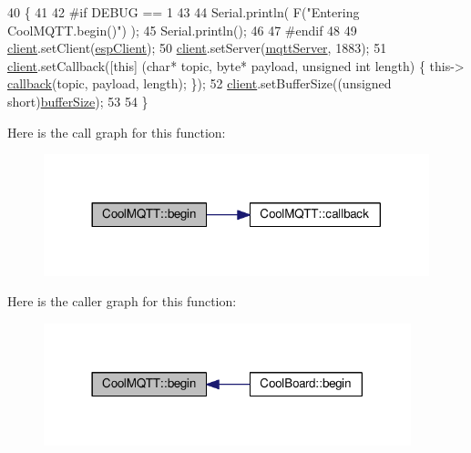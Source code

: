 \begin{DoxyCode}
40 \{ 
41 
42 \textcolor{preprocessor}{#if DEBUG == 1 }
43 
44     Serial.println( F(\textcolor{stringliteral}{"Entering CoolMQTT.begin()"}) );
45     Serial.println();
46 
47 \textcolor{preprocessor}{#endif}
48 
49     \hyperlink{classCoolMQTT_a4ca71e4f76ef868692a297efd45b1415}{client}.setClient(\hyperlink{classCoolMQTT_acc30a0200967374a524092a8a806502a}{espClient});
50     \hyperlink{classCoolMQTT_a4ca71e4f76ef868692a297efd45b1415}{client}.setServer(\hyperlink{classCoolMQTT_ab8bb951f87ddbf92db74c2ad16a3e53e}{mqttServer}, 1883); 
51     \hyperlink{classCoolMQTT_a4ca71e4f76ef868692a297efd45b1415}{client}.setCallback([\textcolor{keyword}{this}] (\textcolor{keywordtype}{char}* topic, byte* payload, \textcolor{keywordtype}{unsigned} \textcolor{keywordtype}{int} length) \{ this->
      \hyperlink{classCoolMQTT_a30d82ad665bfb603f46ecdbc290775df}{callback}(topic, payload, length); \});
52     \hyperlink{classCoolMQTT_a4ca71e4f76ef868692a297efd45b1415}{client}.setBufferSize((\textcolor{keywordtype}{unsigned} \textcolor{keywordtype}{short})\hyperlink{classCoolMQTT_a7f3cf26b51d6770f216e42c5ef13ca9f}{bufferSize});
53 
54 \}
\end{DoxyCode}
Here is the call graph for this function\+:\nopagebreak
\begin{figure}[H]
\begin{center}
\leavevmode
\includegraphics[width=317pt]{classCoolMQTT_ac9248808641ebf3054ed0620ea9d0100_cgraph}
\end{center}
\end{figure}
Here is the caller graph for this function\+:
\nopagebreak
\begin{figure}[H]
\begin{center}
\leavevmode
\includegraphics[width=302pt]{classCoolMQTT_ac9248808641ebf3054ed0620ea9d0100_icgraph}
\end{center}
\end{figure}
\mbox{\label{classCoolMQTT_a30d82ad665bfb603f46ecdbc290775df}} 
